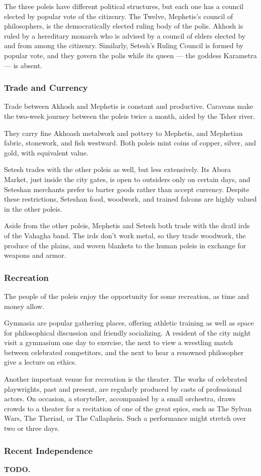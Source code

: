 The three poleis have different political structures, but each one has a council elected by popular vote of the citizenry.
The Twelve, Mephetis's council of philosophers, is the democratically elected ruling body of the polis.
Akhosh is ruled by a hereditary monarch who is advised by a council of elders elected by and from among the citizenry.
Similarly, Setesh's Ruling Council is formed by popular vote, and they govern the polis while its queen --- the goddess Karametra --- is absent.

\subsubsection{Trade and Currency}
Trade between Akhosh and Mephetis is constant and productive.
Caravans make the two-week journey between the poleis twice a month, aided by the Tsher river.

\newpage

They carry fine Akhoash metalwork and pottery to Mephetis, and Mephetian fabric, stonework, and fish westward.
Both poleis mint coins of copper, silver, and gold, with equivalent value.

Setesh trades with the other poleis as well, but less extensively.
Its Abora Market, just inside the city gates, is open to outsiders only on certain days, and Seteshan merchants prefer to barter goods rather than accept currency.
Despite these restrictions, Seteshan food, woodwork, and trained falcons are highly valued in the other poleis.

Aside from the other poleis, Mephetis and Setesh both trade with the dratl irds of the Vahagha band.
The irds don't work metal, so they trade woodwork, the produce of the plains, and woven blankets to the human poleis in exchange for weapons and armor.

\subsubsection{Recreation}
The people of the poleis enjoy the opportunity for some recreation, as time and money allow.

Gymnasia are popular gathering places, offering athletic training as well as space for philosophical discussion and friendly socializing.
A resident of the city might visit a gymnasium one day to exercise, the next to view a wrestling match between celebrated competitors, and the next to hear a renowned philosopher give a lecture on ethics.

Another important venue for recreation is the theater.
The works of celebrated playwrights, past and present, are regularly produced by casts of professional actors.
On occasion, a storyteller, accompanied by a small orchestra, draws crowds to a theater for a recitation of one of the great epics, such as The Sylvan Wars, The Theriad, or The Callapheia.
Such a performance might stretch over two or three days.

\subsubsection{Recent Independence}
\textbf{TODO.}
\newpage
